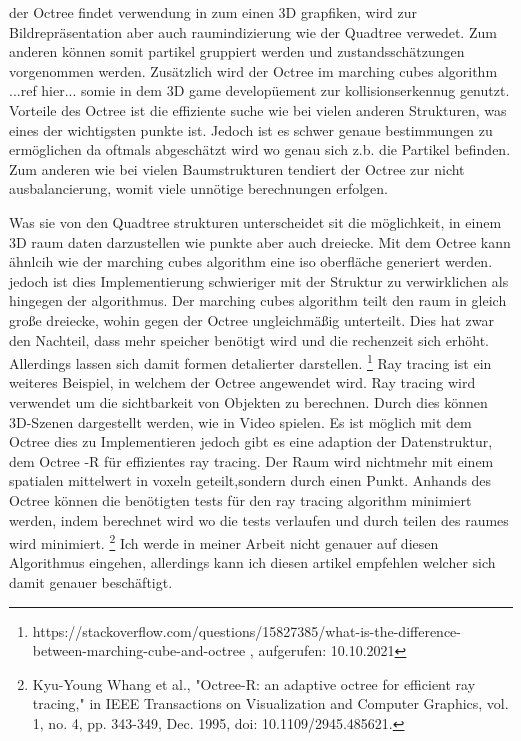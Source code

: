 \documentclass[11pt]{article}
\newcommand{\qt}{Quadtree }
\newcommand{\oc}{Octree }
\begin{document}
der \oc findet verwendung in zum einen 3D grapfiken, wird zur Bildrepräsentation aber auch raumindizierung wie der \qt verwedet. Zum anderen können somit partikel gruppiert werden und zustandsschätzungen vorgenommen werden. Zusätzlich wird der \oc im marching cubes algorithm ...ref hier... somie in dem 3D game developüement zur kollisionserkennug genutzt. 
\newline
Vorteile des \oc ist die effiziente suche wie bei vielen anderen Strukturen, was eines der wichtigsten punkte ist. Jedoch ist es schwer genaue bestimmungen zu ermöglichen da oftmals abgeschätzt wird wo genau sich z.b. die Partikel befinden. Zum anderen wie bei vielen Baumstrukturen tendiert der \oc zur nicht ausbalancierung, womit viele unnötige berechnungen erfolgen. 

Was sie von den \qt strukturen unterscheidet sit die möglichkeit, in einem 3D raum daten darzustellen wie punkte aber auch dreiecke. Mit dem \oc kann ähnlcih wie der marching cubes algorithm eine iso oberfläche generiert werden. jedoch ist dies Implementierung schwieriger mit der Struktur zu verwirklichen als hingegen der algorithmus. 
Der marching cubes algorithm teilt den raum in gleich große dreiecke, wohin gegen der \oc ungleichmäßig unterteilt. Dies hat zwar den Nachteil, dass mehr speicher benötigt wird und die rechenzeit sich erhöht. Allerdings lassen sich damit formen detalierter darstellen. \footnote[2]{https://stackoverflow.com/questions/15827385/what-is-the-difference-between-marching-cube-and-octree , aufgerufen: 10.10.2021}
\newline
Ray tracing ist ein weiteres Beispiel, in welchem der \oc angewendet wird. Ray tracing wird verwendet um die sichtbarkeit von Objekten zu berechnen. Durch dies können 3D-Szenen dargestellt werden, wie in Video spielen.  Es ist möglich mit dem \oc dies zu Implementieren jedoch gibt es eine adaption der Datenstruktur, dem \oc -R für effizientes ray tracing. Der Raum wird nichtmehr mit einem spatialen mittelwert in voxeln geteilt,sondern durch einen Punkt. 
Anhands des \oc können die benötigten tests für den ray tracing algorithm minimiert werden, indem berechnet wird wo die tests verlaufen und durch teilen des raumes wird minimiert.  \footnote[3]{Kyu-Young Whang et al., "Octree-R: an adaptive octree for efficient ray tracing," in IEEE Transactions on Visualization and Computer Graphics, vol. 1, no. 4, pp. 343-349, Dec. 1995, doi: 10.1109/2945.485621.}
Ich werde in meiner Arbeit nicht genauer auf diesen Algorithmus eingehen, allerdings kann ich diesen artikel empfehlen welcher sich damit genauer beschäftigt. \cite{RaytracingOctree}
\end{document}
